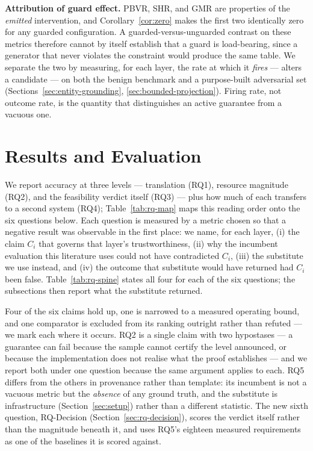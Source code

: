 \documentclass[journal, 10pt]{IEEEtran}
\begin{document}
\textbf{Attribution of guard effect.} PBVR, SHR, and GMR are properties of the \emph{emitted} intervention, and Corollary~\ref{cor:zero} makes the first two identically zero for any guarded configuration. A guarded-versus-unguarded contrast on these metrics therefore cannot by itself establish that a guard is load-bearing, since a generator that never violates the constraint would produce the same table. We separate the two by measuring, for each layer, the rate at which it \emph{fires} --- alters a candidate --- on both the benign benchmark and a purpose-built adversarial set (Sections~\ref{sec:entity-grounding}, \ref{sec:bounded-projection}). Firing rate, not outcome rate, is the quantity that distinguishes an active guarantee from a vacuous one.

\section{Results and Evaluation}
\label{sec:results}

We report accuracy at three levels --- translation (RQ1), resource magnitude
(RQ2), and the feasibility verdict itself (RQ3) --- plus how much of each
transfers to a second system (RQ4); Table~\ref{tab:rq-map} maps this reading
order onto the six questions below. Each question is measured by a metric
chosen so that a negative result was observable in the first place: we name,
for each layer, (i) the claim $C_i$ that governs that layer's trustworthiness,
(ii) why the incumbent evaluation this literature uses could not have
contradicted $C_i$, (iii) the substitute we use instead, and (iv) the outcome
that substitute would have returned had $C_i$ been false. Table~\ref{tab:rq-spine}
states all four for each of the six questions; the subsections then report what
the substitute returned.

Four of the six claims hold up, one is narrowed to a measured operating bound,
and one comparator is excluded from its ranking outright rather than
refuted --- we mark each where it occurs. RQ2 is a single claim with two
hypostases --- a guarantee can fail because the sample cannot certify the level
announced, or because the implementation does not realise what the proof
establishes --- and we report both under one question because the same
argument applies to each. RQ5 differs from the others in provenance rather than
template: its incumbent is not a vacuous metric but the \emph{absence} of any
ground truth, and the substitute is infrastructure (Section~\ref{sec:setup})
rather than a different statistic. The new sixth question, RQ-Decision
(Section~\ref{sec:rq-decision}), scores the verdict itself rather than the
magnitude beneath it, and uses RQ5's eighteen measured requirements as one of
the baselines it is scored against.
\end{document}
